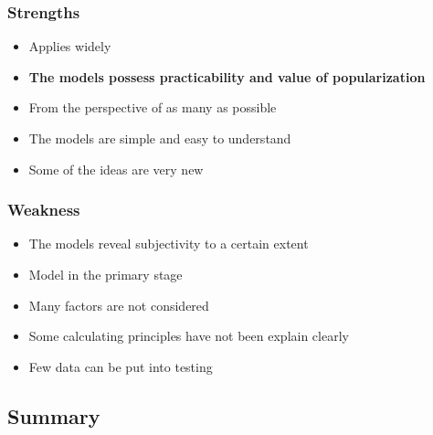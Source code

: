 \subsubsection*{Strengths}
\begin{itemize}
	\item {Applies widely}
	\item \textbf{The models possess practicability and value of popularization}
	\item {From the perspective of as many as possible }
	\item {The models are simple and easy to understand}
	\item {Some of the ideas are very new}
\end{itemize}
\subsubsection*{Weakness}
\begin{itemize}
	\item {The models reveal subjectivity to a certain extent}
	\item {Model in the primary stage}
	\item {Many factors are not considered }
	\item {Some calculating principles have not been explain clearly}
	\item {Few data can be put into testing}
	
\end{itemize}
\subsection{Summary}

